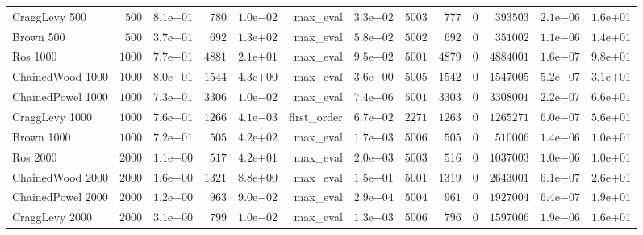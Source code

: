 \begin{longtable}[c]{lrrrrrrrrrrrr}
CraggLevy 500 & \(  500\) & \( 8.1\)e\(-01\) & \(  780\) & \( 1.0\)e\(-02\) & max\_eval & \( 3.3\)e\(+02\) & \( 5003\) & \(  777\) & \(    0\) & \(393503\) & \( 2.1\)e\(-06\) & \( 1.6\)e\(+01\) \\
Brown 500 & \(  500\) & \( 3.7\)e\(-01\) & \(  692\) & \( 1.3\)e\(+02\) & max\_eval & \( 5.8\)e\(+02\) & \( 5002\) & \(  692\) & \(    0\) & \(351002\) & \( 1.1\)e\(-06\) & \( 1.4\)e\(+01\) \\
Ros 1000 & \( 1000\) & \( 7.7\)e\(-01\) & \( 4881\) & \( 2.1\)e\(+01\) & max\_eval & \( 9.5\)e\(+02\) & \( 5001\) & \( 4879\) & \(    0\) & \(4884001\) & \( 1.6\)e\(-07\) & \( 9.8\)e\(+01\) \\
ChainedWood 1000 & \( 1000\) & \( 8.0\)e\(-01\) & \( 1544\) & \( 4.3\)e\(+00\) & max\_eval & \( 3.6\)e\(+00\) & \( 5005\) & \( 1542\) & \(    0\) & \(1547005\) & \( 5.2\)e\(-07\) & \( 3.1\)e\(+01\) \\
ChainedPowel 1000 & \( 1000\) & \( 7.3\)e\(-01\) & \( 3306\) & \( 1.0\)e\(-02\) & max\_eval & \( 7.4\)e\(-06\) & \( 5001\) & \( 3303\) & \(    0\) & \(3308001\) & \( 2.2\)e\(-07\) & \( 6.6\)e\(+01\) \\
CraggLevy 1000 & \( 1000\) & \( 7.6\)e\(-01\) & \( 1266\) & \( 4.1\)e\(-03\) & first\_order & \( 6.7\)e\(+02\) & \( 2271\) & \( 1263\) & \(    0\) & \(1265271\) & \( 6.0\)e\(-07\) & \( 5.6\)e\(+01\) \\
Brown 1000 & \( 1000\) & \( 7.2\)e\(-01\) & \(  505\) & \( 4.2\)e\(+02\) & max\_eval & \( 1.7\)e\(+03\) & \( 5006\) & \(  505\) & \(    0\) & \(510006\) & \( 1.4\)e\(-06\) & \( 1.0\)e\(+01\) \\
Ros 2000 & \( 2000\) & \( 1.1\)e\(+00\) & \(  517\) & \( 4.2\)e\(+01\) & max\_eval & \( 2.0\)e\(+03\) & \( 5003\) & \(  516\) & \(    0\) & \(1037003\) & \( 1.0\)e\(-06\) & \( 1.0\)e\(+01\) \\
ChainedWood 2000 & \( 2000\) & \( 1.6\)e\(+00\) & \( 1321\) & \( 8.8\)e\(+00\) & max\_eval & \( 1.5\)e\(+01\) & \( 5001\) & \( 1319\) & \(    0\) & \(2643001\) & \( 6.1\)e\(-07\) & \( 2.6\)e\(+01\) \\
ChainedPowel 2000 & \( 2000\) & \( 1.2\)e\(+00\) & \(  963\) & \( 9.0\)e\(-02\) & max\_eval & \( 2.9\)e\(-04\) & \( 5004\) & \(  961\) & \(    0\) & \(1927004\) & \( 6.4\)e\(-07\) & \( 1.9\)e\(+01\) \\
CraggLevy 2000 & \( 2000\) & \( 3.1\)e\(+00\) & \(  799\) & \( 1.0\)e\(-02\) & max\_eval & \( 1.3\)e\(+03\) & \( 5006\) & \(  796\) & \(    0\) & \(1597006\) & \( 1.9\)e\(-06\) & \( 1.6\)e\(+01\) \\

\end{longtable}
